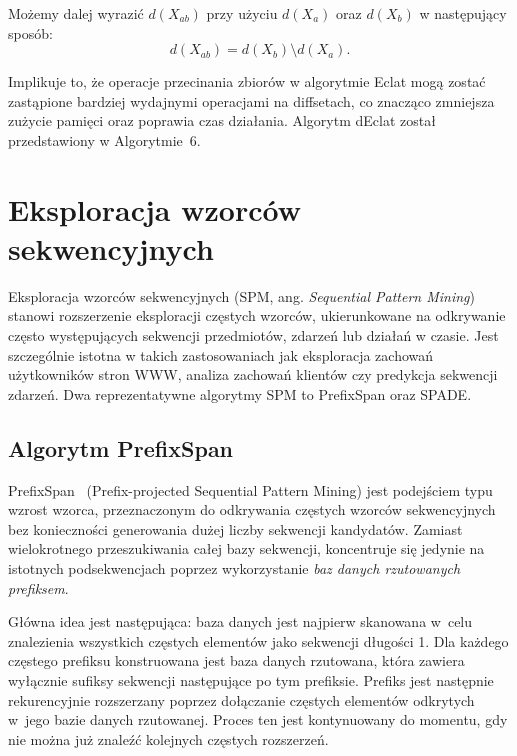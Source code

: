 Możemy dalej wyrazić $d(X_{ab})$ przy użyciu $d(X_a)$ oraz $d(X_b)$ w następujący sposób:
\begin{equation}
d(X_{ab}) = d(X_b) \setminus d(X_a).
\end{equation}


Implikuje to, że operacje przecinania zbiorów w algorytmie Eclat mogą zostać zastąpione bardziej wydajnymi operacjami na diffsetach, co znacząco zmniejsza zużycie pamięci oraz poprawia czas działania. Algorytm dEclat został przedstawiony w Algorytmie~6.



\section{Eksploracja wzorców sekwencyjnych}
\label{sec:sequential}
Eksploracja wzorców sekwencyjnych (SPM, ang. \textit{Sequential Pattern Mining})~\cite{agarwal1995spam} stanowi rozszerzenie eksploracji częstych wzorców, ukierunkowane na odkrywanie często występujących sekwencji przedmiotów, zdarzeń lub działań w czasie. Jest szczególnie istotna w takich zastosowaniach jak eksploracja zachowań użytkowników stron WWW, analiza zachowań klientów czy predykcja sekwencji zdarzeń. Dwa reprezentatywne algorytmy SPM to PrefixSpan oraz SPADE.



\subsection{Algorytm PrefixSpan}
PrefixSpan~\cite{pei2001prefixspan} (Prefix-projected Sequential Pattern Mining) jest podejściem typu wzrost wzorca, przeznaczonym do odkrywania częstych wzorców sekwencyjnych bez konieczności generowania dużej liczby sekwencji kandydatów. Zamiast wielokrotnego przeszukiwania całej bazy sekwencji, koncentruje się jedynie na istotnych podsekwencjach poprzez wykorzystanie \emph{baz danych rzutowanych prefiksem}.

Główna idea jest następująca: baza danych jest najpierw skanowana w~celu znalezienia wszystkich częstych elementów jako sekwencji długości 1. Dla każdego częstego prefiksu konstruowana jest baza danych rzutowana, która zawiera wyłącznie sufiksy sekwencji następujące po tym prefiksie. Prefiks jest następnie rekurencyjnie rozszerzany poprzez dołączanie częstych elementów odkrytych w~jego bazie danych rzutowanej. Proces ten jest kontynuowany do momentu, gdy nie można już znaleźć kolejnych częstych rozszerzeń.

